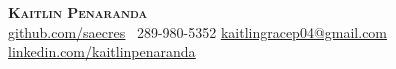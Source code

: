 \begin{center}
    \textbf{\Huge \scshape Kaitlin Penaranda} \\  \vspace{10pt} 
    \vspace{5pt}
    \href{https://github.com/Saecres}{ \underline{github.com/saecres}}
     \ \small 289-980-5352 \quad
    \href{mailto:kaitlingracep04@gmail.com}{ \underline{kaitlingracep04@gmail.com}} \quad
    \href{https://www.linkedin.com/in/kaitlinpenaranda/}{ \underline{linkedin.com/kaitlinpenaranda}} \quad

\end{center}